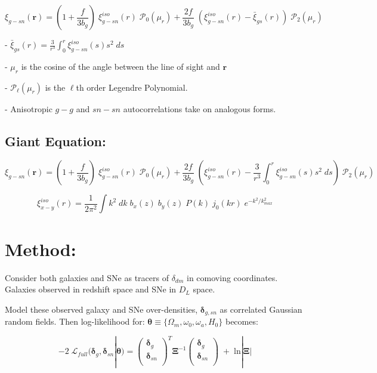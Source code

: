 \documentclass{article}
\begin{document}
\begin{equation}
\xi_{g-sn}(\boldsymbol{r}) = (1 + \frac{f}{3 b_g}) \;  \xi^{iso}_{g-sn}(r) \; \mathcal{P}_0(\mu_r) + \frac{2 f}{3 b_g} \;  (\xi^{iso}_{g-sn}(r) - \bar{\xi}_{gs}(r)) \;  \mathcal{P}_2(\mu_r)
\end{equation}

- $\bar{\xi}_{gs}(r) = \frac{3}{r^3}\int^r_0 \xi^{iso}_{g-sn}(s)s^2 \; ds$

- $\mu_r$ is the cosine of the angle between the line of sight and $\textbf{r}$

- $\mathcal{P}_{\mathcal{\ell}}(\mu_r)$ is the $\mathcal{\ell}$th order Legendre Polynomial. 

- Anisotropic $g-g$ and $sn-sn$ autocorrelations take on analogous forms.  


\subsection{Giant Equation:}

\begin{equation}
\xi_{g-sn}(\textbf{r}) = 
(1 + \frac{f}{3 b_g}) \;  \xi^{iso}_{g-sn}(r) \; \mathcal{P}_0(\mu_r) + 
\frac{2 f}{3 b_g} \;  (\xi^{iso}_{g-sn}(r) -\frac{3}{r^3}\int^r_0 \xi^{iso}_{g-sn}(s)s^2 \; ds) \;  \mathcal{P}_2(\mu_r)
\end{equation}

\begin{equation}
\xi^{iso}_{x-y}(r) = \frac{1}{2 \pi^2} \int k^2 \; dk \; b_x(z) \; b_y(z) \; P(k) \; j_0(kr) \; e^{-k^2/k^2_{max}}
\end{equation}


\section{Method:}

Consider both galaxies and SNe as tracers of $\delta_{dm}$ in comoving coordinates. Galaxies observed in redshift space and SNe in $D_L$ space. 

Model these observed galaxy and SNe over-densities, $\boldsymbol{\delta}_{g, sn}$ as correlated Gaussian random fields. Then log-likelihood for: $\boldsymbol{\theta} \equiv \{\Omega_m, \omega_0, \omega_a, H_0\}$ becomes: 

\begin{equation}
- 2 \; \mathcal{L}_{full}(\boldsymbol{\delta}_g, \boldsymbol{\delta}_{sn} | \boldsymbol{\theta}) = \left(
\begin{array}{c} 
\boldsymbol{\delta}_g \\
\boldsymbol{\delta}_{sn} \\ 
\end{array} 
\right) ^T  \boldsymbol{\Xi}^{-1} \left(
\begin{array}{c} 
\boldsymbol{\delta}_g \\
\boldsymbol{\delta}_{sn} \\ 
\end{array} 
\right) \; + \; \text{ln} | \boldsymbol{\Xi} | 
\end{equation}
\end{document}

